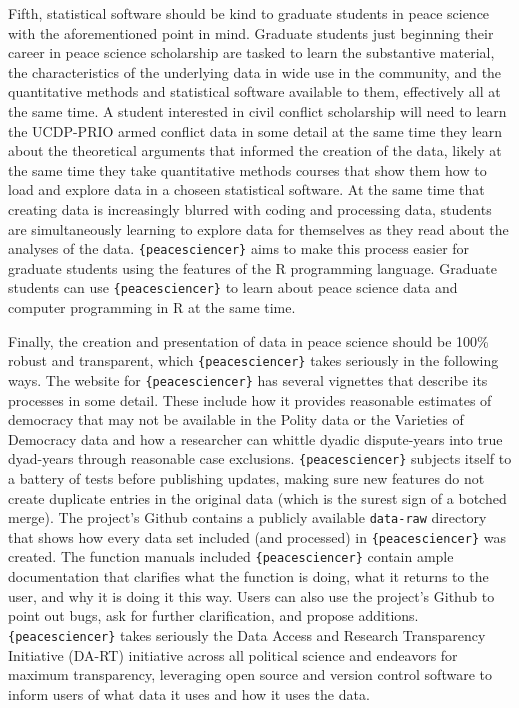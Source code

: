 \documentclass[
  11pt,
]{article}
\begin{document}
Fifth, statistical software should be kind to graduate students in peace science with the aforementioned point in mind. Graduate students just beginning their career in peace science scholarship are tasked to learn the substantive material, the characteristics of the underlying data in wide use in the community, and the quantitative methods and statistical software available to them, effectively all at the same time. A student interested in civil conflict scholarship will need to learn the UCDP-PRIO armed conflict data in some detail at the same time they learn about the theoretical arguments that informed the creation of the data, likely at the same time they take quantitative methods courses that show them how to load and explore data in a choseen statistical software. At the same time that creating data is increasingly blurred with coding and processing data, students are simultaneously learning to explore data for themselves as they read about the analyses of the data. \texttt{\{peacesciencer\}} aims to make this process easier for graduate students using the features of the R programming language. Graduate students can use \texttt{\{peacesciencer\}} to learn about peace science data and computer programming in R at the same time.

Finally, the creation and presentation of data in peace science should be 100\% robust and transparent, which \texttt{\{peacesciencer\}} takes seriously in the following ways. The website for \texttt{\{peacesciencer\}} has several vignettes that describe its processes in some detail. These include how it provides reasonable estimates of democracy that may not be available in the Polity data or the Varieties of Democracy data and how a researcher can whittle dyadic dispute-years into true dyad-years through reasonable case exclusions. \texttt{\{peacesciencer\}} subjects itself to a battery of tests before publishing updates, making sure new features do not create duplicate entries in the original data (which is the surest sign of a botched merge). The project's Github contains a publicly available \texttt{data-raw} directory that shows how every data set included (and processed) in \texttt{\{peacesciencer\}} was created. The function manuals included \texttt{\{peacesciencer\}} contain ample documentation that clarifies what the function is doing, what it returns to the user, and why it is doing it this way. Users can also use the project's Github to point out bugs, ask for further clarification, and propose additions. \texttt{\{peacesciencer\}} takes seriously the Data Access and Research Transparency Initiative (DA-RT) initiative across all political science and endeavors for maximum transparency, leveraging open source and version control software to inform users of what data it uses and how it uses the data.
\end{document}
